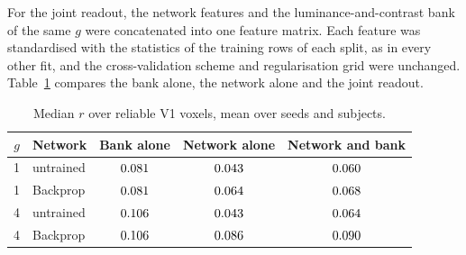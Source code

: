 For the joint readout, the network features and the luminance-and-contrast bank of the same
$g$ were concatenated into one feature matrix. Each feature was standardised with the
statistics of the training rows of each split, as in every other fit, and the cross-validation
scheme and regularisation grid were unchanged. Table~\ref{tab:joint} compares the bank alone,
the network alone and the joint readout.

\begin{table}[H]
\centering
\footnotesize
\setlength{\tabcolsep}{3pt}
\begin{tabular}{@{}clccc@{}}
\toprule
$g$ & Network & Bank alone & Network alone & Network and bank \\
\midrule
1 & untrained & $0.081$ & $0.043$ & $0.060$ \\
1 & Backprop & $0.081$ & $0.064$ & $0.068$ \\
4 & untrained & $0.106$ & $0.043$ & $0.064$ \\
4 & Backprop & $0.106$ & $0.086$ & $0.090$ \\
\bottomrule
\end{tabular}
\caption{Median $r$ over reliable V1 voxels, mean over seeds and subjects.}
\label{tab:joint}
\end{table}
